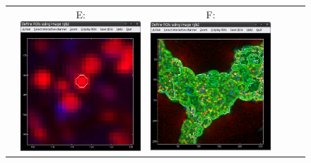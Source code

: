 \begin{figure}[!ht]
\begin{tabular}{cccccc}
&
E: \includegraphics[scale=0.23]{figs3/LANS-roi-interactive4}
&
F: \includegraphics[scale=0.23]{figs3/LANS-roi-interactive5}

\end{tabular}
\end{figure}
